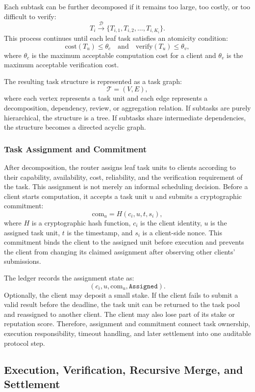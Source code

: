 \documentclass{article}
\theoremstyle{plain}
\begin{document}
Each subtask can be further decomposed if it remains too large, too costly, or too difficult to verify:
\[
T_i \xrightarrow{\mathcal{D}} \{T_{i,1}, T_{i,2}, \ldots, T_{i,K_i}\}.
\]
This process continues until each leaf task satisfies an atomicity condition:
\[
\text{cost}(T_u) \leq \theta_c
\quad \text{and} \quad
\text{verify}(T_u) \leq \theta_v,
\]
where $\theta_c$ is the maximum acceptable computation cost for a client and $\theta_v$ is the maximum acceptable verification cost.

The resulting task structure is represented as a task graph:
\[
\mathcal{T} = (V,E),
\]
where each vertex represents a task unit and each edge represents a decomposition, dependency, review, or aggregation relation. If subtasks are purely hierarchical, the structure is a tree. If subtasks share intermediate dependencies, the structure becomes a directed acyclic graph.

\subsubsection{Task Assignment and Commitment}

After decomposition, the router assigns leaf task units to clients according to their capability, availability, cost, reliability, and the verification requirement of the task. This assignment is not merely an informal scheduling decision. Before a client starts computation, it accepts a task unit $u$ and submits a cryptographic commitment:
\[
\mathrm{com}_u = H(c_i, u, t, s_i),
\]
where $H$ is a cryptographic hash function, $c_i$ is the client identity, $u$ is the assigned task unit, $t$ is the timestamp, and $s_i$ is a client-side nonce. This commitment binds the client to the assigned unit before execution and prevents the client from changing its claimed assignment after observing other clients' submissions.

The ledger records the assignment state as:
\[
(c_i, u, \mathrm{com}_u, \texttt{Assigned}).
\]
Optionally, the client may deposit a small stake. If the client fails to submit a valid result before the deadline, the task unit can be returned to the task pool and reassigned to another client. The client may also lose part of its stake or reputation score. Therefore, assignment and commitment connect task ownership, execution responsibility, timeout handling, and later settlement into one auditable protocol step.

\subsection{Execution, Verification, Recursive Merge, and Settlement}
\end{document}
